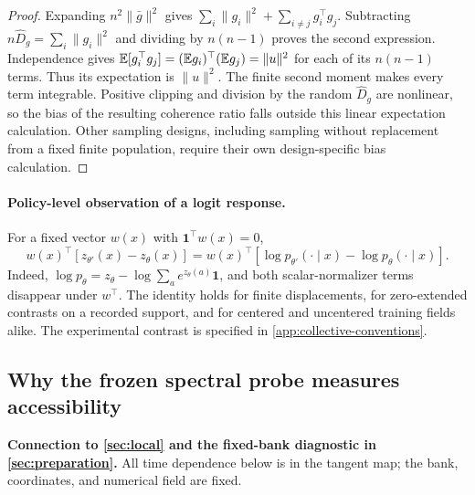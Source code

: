 \begin{proof}
Expanding $n^2\|\bar g\|^2$ gives $\sum_i\|g_i\|^2+\sum_{i\ne j}g_i^\top g_j$. Subtracting $n\widehat D_g=\sum_i\|g_i\|^2$ and dividing by $n(n-1)$ proves the second expression. Independence gives $\mathbb{E}[g_i^\top g_j]=(\mathbb{E} g_i)^\top(\mathbb{E} g_j)=\|u\|^2$ for each of its $n(n-1)$ terms. Thus its expectation is $\|u\|^2$. The finite second moment makes every term integrable. Positive clipping and division by the random $\widehat D_g$ are nonlinear, so the bias of the resulting coherence ratio falls outside this linear expectation calculation. Other sampling designs, including sampling without replacement from a fixed finite population, require their own design-specific bias calculation.
\end{proof}

\paragraph{Policy-level observation of a logit response.}
\label{app:contrast-observation}
For a fixed vector $w(x)$ with $\mathbf1^\top w(x)=0$,
\[
 w(x)^\top[z_{\theta'}(x)-z_\theta(x)]
 =w(x)^\top[\log p_{\theta'}(\cdot\mid x)-\log p_\theta(\cdot\mid x)].
\]
Indeed, $\log p_\theta=z_\theta-\log\sum_a e^{z_\theta(a)}\mathbf1$, and both scalar-normalizer terms disappear under $w^\top$. The identity holds for finite displacements, for zero-extended contrasts on a recorded support, and for centered and uncentered training fields alike. The experimental contrast is specified in \cref{app:collective-conventions}.

\subsection{Why the frozen spectral probe measures accessibility}
\label{app:collective-frozen}
\textbf{Connection to \cref{sec:local} and the fixed-bank diagnostic in \cref{sec:preparation}.} All time dependence below is in the tangent map; the bank, coordinates, and numerical field are fixed.

